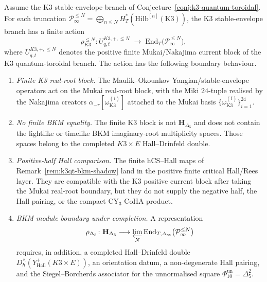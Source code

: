 \begin{theorem}
\label{thm:k3qt-mo-stabilised-action}
Assume the K3 stable-envelope branch of
Conjecture~\ref{conj:k3-quantum-toroidal}.
For each truncation
$\mathcal P_\infty^{\leq N}=\bigoplus_{n\leq N}
H^*_T(\mathrm{Hilb}^{[n]}(\mathrm K3))$, the K3 stable-envelope branch
has a finite action
\[
 \rho_{K3}^{\leq N}\colon
 U_{q,t}^{K3,+,\leq N}
 \;\longrightarrow\;
 \mathrm{End}_{T}\bigl(\mathcal P_\infty^{\leq N}\bigr),
\]
where $U_{q,t}^{K3,+,\leq N}$ denotes the positive finite
Mukai/Nakajima current block of the K3 quantum-toroidal branch. The
action has the following boundary behaviour.
\begin{enumerate}[label=\textup{(\roman*)}]
\item \emph{Finite K3 real-root block.}
The Maulik--Okounkov Yangian/stable-envelope operators act on the
Mukai real-root block, with the Miki $24$-tuple realised by the
Nakajima creators
$\alpha_{-r}[\omega^{(i)}_{\mathrm K3}]$ attached to the Mukai basis
$\{\omega^{(i)}_{\mathrm K3}\}_{i = 1}^{24}$.
\item \emph{No finite BKM equality.}
The finite K3 block is not $\mathbf H_{\Delta_5}$ and does not contain
the lightlike or timelike BKM imaginary-root multiplicity spaces. Those
spaces belong to the completed $K3 \times E$ Hall--Drinfeld double.
\item \emph{Positive-half Hall comparison.}
The finite hCS--Hall maps of
Remark~\ref{rem:k3qt-bkm-shadow} land in the positive finite critical
Hall/Rees layer. They are compatible with the K3 positive current block
after taking the Mukai real-root boundary, but they do not supply the
negative half, the Hall pairing, or the compact CY$_3$ CoHA product.
\item \emph{BKM module boundary under completion.}
A representation
\[
 \rho_{\Delta_5}\colon
 \mathbf H_{\Delta_5}
 \longrightarrow
 \varprojlim_N\mathrm{End}_{T,A_\infty}
 \bigl(\mathcal P_\infty^{\leq N}\bigr)
\]
requires, in addition, a completed Hall--Drinfeld double
$D^\wedge_\hbar(Y^+_{\mathrm{Hall}}(K3\times E))$, an orientation
datum, a non-degenerate Hall pairing, and the Siegel--Borcherds
associator for the unnormalised square
$\Phi_{10}^{\mathrm{un}}=\Delta_5^2$.
\end{enumerate}
\end{theorem}

